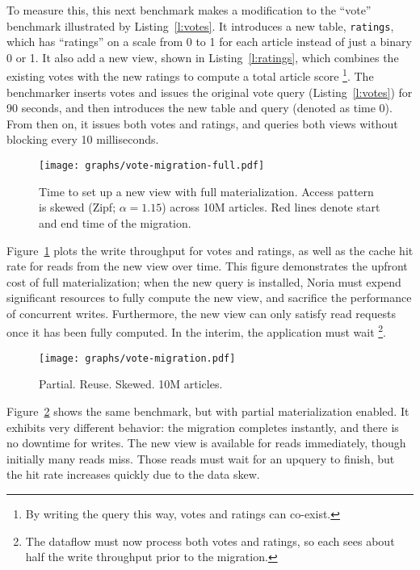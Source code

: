 To measure this, this next benchmark makes a modification to the ``vote''
benchmark illustrated by Listing~\ref{l:votes}. It introduces a new table,
\texttt{ratings}, which has ``ratings'' on a scale from 0 to 1 for each article
instead of just a binary 0 or 1. It also add a new view, shown in
Listing~\ref{l:ratings}, which combines the existing votes with the new ratings
to compute a total article score%
\footnote{By writing the query this way, votes and ratings can co-exist.}.
The benchmarker inserts votes and issues the original vote query
(Listing~\ref{l:votes}) for 90 seconds, and then introduces the new table and
query (denoted as time 0). From then on, it issues both votes and ratings, and
queries both views without blocking every 10 milliseconds.

\begin{figure}[t]
  \centering
  \texttt{[image: graphs/vote-migration-full.pdf]}
  \caption{Time to set up a new view with full materialization. Access pattern
  is skewed (Zipf; $\alpha = 1.15$) across 10M articles. Red lines denote start
  and end time of the migration.}
  \label{f:vote-migration-full}
\end{figure}

Figure~\ref{f:vote-migration-full} plots the write throughput for votes and
ratings, as well as the cache hit rate for reads from the new view over time.
This figure demonstrates the upfront cost of full materialization; when the new
query is installed, Noria must expend significant resources to fully compute the
new view, and sacrifice the performance of concurrent writes. Furthermore, the
new view can only satisfy read requests once it has been fully computed. In the
interim, the application must wait%
\footnote{The dataflow must now process both votes and ratings, so each sees
about half the write throughput prior to the migration.}.

\begin{figure}[t]
  \centering
  \texttt{[image: graphs/vote-migration.pdf]}
  \caption{Partial. Reuse. Skewed. 10M articles.}
  \label{f:vote-migration}
\end{figure}

Figure~\ref{f:vote-migration} shows the same benchmark, but with partial
materialization enabled. It exhibits very different behavior: the migration
completes instantly, and there is no downtime for writes. The new view is
available for reads immediately, though initially many reads miss. Those reads
must wait for an upquery to finish, but the hit rate increases quickly due to
the data skew.


